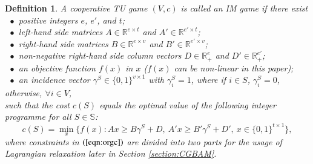 \documentclass[authoryear,review,12pt]{elsarticle}
\newtheorem{definition}{Definition}
\newcommand{\R}{\mathbb{R}}
\begin{document}
\renewcommand{\baselinestretch}{1.5}
\begin{definition}\label{defi:ORG}
A cooperative TU game $(V,c)$ is called an IM game if there exist\\
$~~\bullet$ positive integers $e$, $e'$, and $t$;\\
$~~\bullet$ left-hand side matrices $A \in \R^{e \times t}$ and $A' \in \R^{e' \times t}$;\\
$~~\bullet$ right-hand side matrices $B \in \R^{e \times v}$ and $B' \in \R^{e' \times v}$;\\
$~~\bullet$ non-negative right-hand side column vectors $D \in \R^{e}_+$ and $D' \in \R^{e'}_+$;\\
$~~\bullet$ an objective function $f(x)$ in $x$ \big($f(x)$ can be non-linear in this paper\big);\\
$~~\bullet$ an incidence vector $\gamma^S \in \{0,1\}^{v \times 1}$ with $\gamma_i^S=1$, where if $i \in S$, $\gamma_i^S=0$, otherwise, $\forall i \in V$,\\
such that the cost $c(S)$ equals the optimal value of the following integer programme for all $S \in \mathbb{S}$:
\begin{equation}\label{eqn:orgc}
c(S) = \min_{x} \bigg\{ f(x):Ax \geq B\gamma^S + D, ~A'x \geq B'\gamma^S + D', ~x \in \{0,1\}^{t \times 1} \bigg\},
\end{equation}
where constraints in $(\ref{eqn:orgc})$ are divided into two parts for the usage of Lagrangian relaxation later in Section \ref{section:CGBAM}.
\end{definition}
\end{document}
